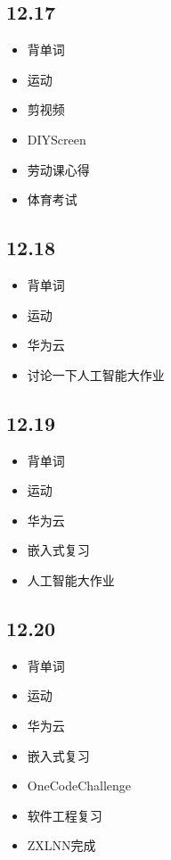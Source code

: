 \documentclass[UTF8]{ctexart}
\begin{document}
\subsection*{12.17}
\begin{itemize}
    \item 背单词
    \item 运动
    \item 剪视频
    \item DIYScreen
    \item 劳动课心得
    \item 体育考试
\end{itemize}

\subsection*{12.18}
\begin{itemize}
    \item 背单词
    \item 运动
    \item 华为云
    \item 讨论一下人工智能大作业
\end{itemize}

\subsection*{12.19}
\begin{itemize}
    \item 背单词
    \item 运动
    \item 华为云
    \item 嵌入式复习
    \item 人工智能大作业
\end{itemize}

\subsection*{12.20}
\begin{itemize}
    \item 背单词
    \item 运动
    \item 华为云
    \item 嵌入式复习
    \item OneCodeChallenge
    \item 软件工程复习
    \item ZXLNN完成
\end{itemize}
\end{document}
